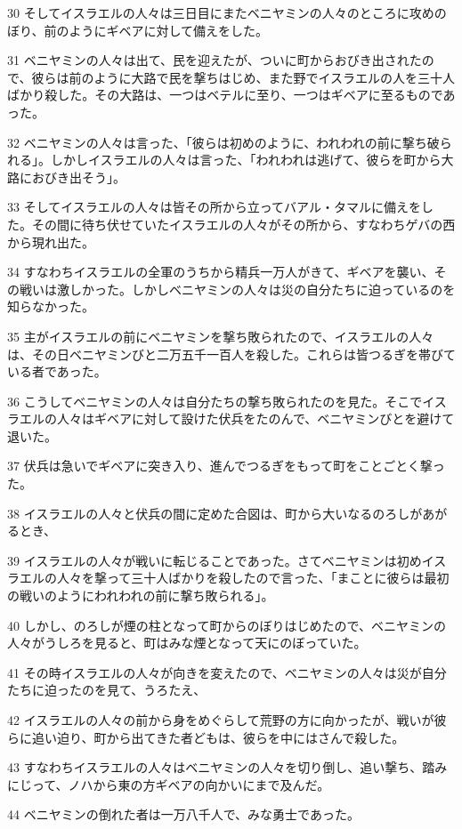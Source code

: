 \par 30 そしてイスラエルの人々は三日目にまたベニヤミンの人々のところに攻めのぼり、前のようにギベアに対して備えをした。
\par 31 ベニヤミンの人々は出て、民を迎えたが、ついに町からおびき出されたので、彼らは前のように大路で民を撃ちはじめ、また野でイスラエルの人を三十人ばかり殺した。その大路は、一つはベテルに至り、一つはギベアに至るものであった。
\par 32 ベニヤミンの人々は言った、「彼らは初めのように、われわれの前に撃ち破られる」。しかしイスラエルの人々は言った、「われわれは逃げて、彼らを町から大路におびき出そう」。
\par 33 そしてイスラエルの人々は皆その所から立ってバアル・タマルに備えをした。その間に待ち伏せていたイスラエルの人々がその所から、すなわちゲバの西から現れ出た。
\par 34 すなわちイスラエルの全軍のうちから精兵一万人がきて、ギベアを襲い、その戦いは激しかった。しかしベニヤミンの人々は災の自分たちに迫っているのを知らなかった。
\par 35 主がイスラエルの前にベニヤミンを撃ち敗られたので、イスラエルの人々は、その日ベニヤミンびと二万五千一百人を殺した。これらは皆つるぎを帯びている者であった。
\par 36 こうしてベニヤミンの人々は自分たちの撃ち敗られたのを見た。そこでイスラエルの人々はギベアに対して設けた伏兵をたのんで、ベニヤミンびとを避けて退いた。
\par 37 伏兵は急いでギベアに突き入り、進んでつるぎをもって町をことごとく撃った。
\par 38 イスラエルの人々と伏兵の間に定めた合図は、町から大いなるのろしがあがるとき、
\par 39 イスラエルの人々が戦いに転じることであった。さてベニヤミンは初めイスラエルの人々を撃って三十人ばかりを殺したので言った、「まことに彼らは最初の戦いのようにわれわれの前に撃ち敗られる」。
\par 40 しかし、のろしが煙の柱となって町からのぼりはじめたので、ベニヤミンの人々がうしろを見ると、町はみな煙となって天にのぼっていた。
\par 41 その時イスラエルの人々が向きを変えたので、ベニヤミンの人々は災が自分たちに迫ったのを見て、うろたえ、
\par 42 イスラエルの人々の前から身をめぐらして荒野の方に向かったが、戦いが彼らに追い迫り、町から出てきた者どもは、彼らを中にはさんで殺した。
\par 43 すなわちイスラエルの人々はベニヤミンの人々を切り倒し、追い撃ち、踏みにじって、ノハから東の方ギベアの向かいにまで及んだ。
\par 44 ベニヤミンの倒れた者は一万八千人で、みな勇士であった。
